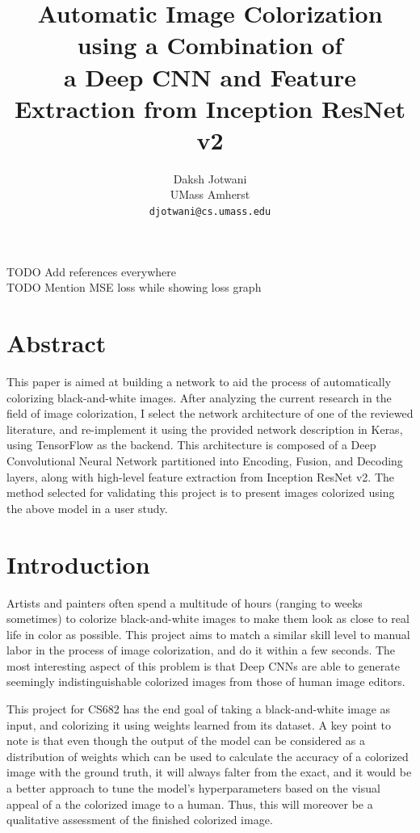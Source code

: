 \documentclass[10pt,twocolumn,letterpaper]{article}
\begin{document}
\title{Automatic Image Colorization using a Combination of\\
a Deep CNN and Feature Extraction from Inception ResNet v2}

\author{Daksh Jotwani\\
UMass Amherst\\
{\tt\small djotwani@cs.umass.edu}
}

\maketitle

TODO Add references everywhere\\
TODO Mention MSE loss while showing loss graph

\section{Abstract}
This paper is aimed at building a network to aid the process of automatically colorizing black-and-white images. After analyzing the current research in the field of image colorization, I select the network architecture of one of the reviewed literature, and re-implement it using the provided network description in Keras, using TensorFlow as the backend. This architecture is composed of a Deep Convolutional Neural Network partitioned into Encoding, Fusion, and Decoding layers, along with high-level feature extraction from Inception ResNet v2. The method selected for validating this project is to present images colorized using the above model in a user study.

\section{Introduction}
Artists and painters often spend a multitude of hours (ranging to weeks sometimes) to colorize black-and-white images to make them look as close to real life in color as possible. This project aims to match a similar skill level to manual labor in the process of image colorization, and do it within a few seconds. The most interesting aspect of this problem is that Deep CNNs are able to generate seemingly indistinguishable colorized images from those of human image editors.

This project for CS682 has the end goal of taking a black-and-white image as input, and colorizing it using weights learned from its dataset. A key point to note is that even though the output of the model can be considered as a distribution of weights which can be used to calculate the accuracy of a colorized image with the ground truth, it will always falter from the exact, and it would be a better approach to tune the model's hyperparameters based on the visual appeal of a the colorized image to a human. Thus, this will moreover be a qualitative assessment of the finished colorized image.
\end{document}
